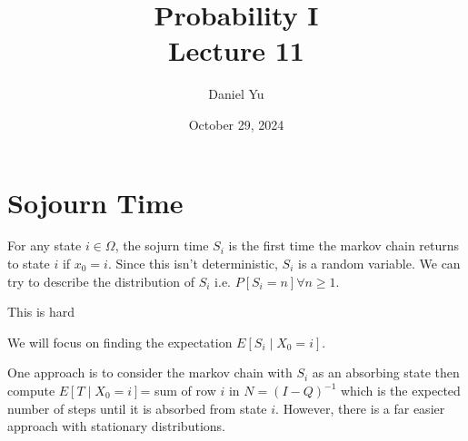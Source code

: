 \documentclass[a4paper]{article}
\title{\Huge{Probability I}\\ Lecture 11}
\author{\huge{Daniel Yu}}
\date{October 29, 2024}
\begin{document}
\maketitle
\newpage%
\tableofcontents
\pagebreak

\section{Sojourn Time}
\begin{definition}
  For any state $i \in \Omega$, the sojurn time $S_i$ is the first time the markov chain returns to state  $i$ if  $x_0 = i$.  Since this isn't deterministic, $S_i$ is a random variable. We can try to describe the distribution of  $S_i$ i.e.  $P[S_i = n] \forall n \geq 1$.  
  \begin{note}
    This is hard
  \end{note}
  We will focus on finding the expectation $E[S_i \mid X_0 = i]$. 
\end{definition}

\begin{remark}
  One approach is to consider the markov chain with $S_i$ as an absorbing state then compute  $E[T \mid X_0 =i]$= sum of row $i$ in  $N = (I-Q)^{-1}$ which is the expected number of steps  until it is absorbed from state $i$. However, there is a far easier approach with stationary distributions.
\end{remark}
\end{document}
